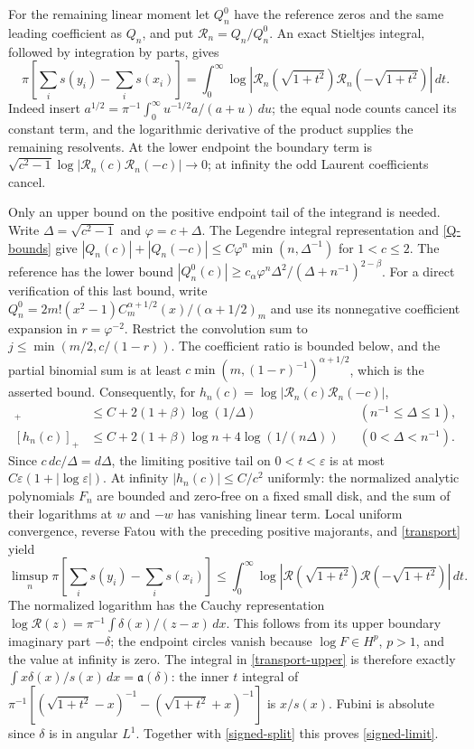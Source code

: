 \documentclass[a4paper,11pt]{amsart}
\theoremstyle{remark}\newtheorem{remark}[theorem]{Remark}
\newcommand{\dd}{\,d}
\begin{document}
For the remaining linear moment let $Q_n^0$ have the reference
zeros and the same leading coefficient as $Q_n$, and put
$\mathcal R_n=Q_n/Q_n^0$. An exact Stieltjes integral, followed by
integration by parts, gives
\begin{equation}\label{transport}
 \pi\left[\sum_i s(y_i)-\sum_i s(x_i)\right]
 =\int_0^\infty\log|\mathcal R_n(\sqrt{1+t^2})
                            \mathcal R_n(-\sqrt{1+t^2})|\dd t.
\end{equation}
Indeed insert
$a^{1/2}=\pi^{-1}\int_0^\infty u^{-1/2}a/(a+u)\dd u$;
the equal node counts cancel its constant term, and the logarithmic
derivative of the product supplies the remaining resolvents.
At the lower endpoint the boundary term is
$\sqrt{c^2-1}\log|\mathcal R_n(c)\mathcal R_n(-c)|\to0$;
at infinity the odd Laurent coefficients cancel.

Only an upper bound on the positive endpoint tail of the integrand
is needed. Write $\Delta=\sqrt{c^2-1}$ and $\varphi=c+\Delta$.
The Legendre integral representation and \eqref{Q-bounds} give
$|Q_n(c)|+|Q_n(-c)|\le C\varphi^n\min(n,\Delta^{-1})$
for $1<c\le2$. The reference has the lower bound
$|Q_n^0(c)|\ge c_\alpha\varphi^n
 \Delta^2/(\Delta+n^{-1})^{2-\beta}$.
For a direct verification of this last bound, write
$Q_n^0=2m!(x^2-1)C_m^{\alpha+1/2}(x)/(\alpha+1/2)_m$
and use its nonnegative coefficient expansion in
$r=\varphi^{-2}$. Restrict the convolution sum to
$j\le\min(m/2,c/(1-r))$. The coefficient ratio is bounded below,
and the partial binomial sum is at least
$c\min(m,(1-r)^{-1})^{\alpha+1/2}$, which is the asserted bound.
Consequently, for
$h_n(c)=\log|\mathcal R_n(c)\mathcal R_n(-c)|$,
\begin{align*}
 [h_n(c)]_+&\le C+2(1+\beta)\log(1/\Delta)
       &&(n^{-1}\le\Delta\le1),\\
 [h_n(c)]_+&\le C+2(1+\beta)\log n
                  +4\log(1/(n\Delta))&&(0<\Delta<n^{-1}).
\end{align*}
Since $c\,dc/\Delta=d\Delta$, the limiting positive tail on
$0<t<\varepsilon$ is at most
$C\varepsilon(1+|\log\varepsilon|)$.
At infinity $|h_n(c)|\le C/c^2$ uniformly: the normalized analytic
polynomials $F_n$ are bounded and zero-free on a fixed small disk,
and the sum of their logarithms at $w$ and $-w$ has vanishing linear
term. Local uniform convergence, reverse Fatou with the preceding
positive majorants, and \eqref{transport} yield
\begin{equation}\label{transport-upper}
 \limsup_n\pi\left[\sum_i s(y_i)-\sum_i s(x_i)\right]
 \le\int_0^\infty\log|\mathcal R(\sqrt{1+t^2})
                              \mathcal R(-\sqrt{1+t^2})|\dd t.
\end{equation}
The normalized logarithm has the Cauchy representation
$\log\mathcal R(z)=\pi^{-1}\int\delta(x)/(z-x)\dd x$.
This follows from its upper boundary imaginary part $-\delta$;
the endpoint circles vanish because $\log F\in H^p$, $p>1$,
and the value at infinity is zero.
The integral in \eqref{transport-upper} is therefore exactly
$\int x\delta(x)/s(x)\dd x=\mathfrak a(\delta)$:
the inner $t$ integral of
$\pi^{-1}[(\sqrt{1+t^2}-x)^{-1}-(\sqrt{1+t^2}+x)^{-1}]$
is $x/s(x)$. Fubini is absolute since $\delta$ is in angular $L^1$.
Together with \eqref{signed-split} this proves \eqref{signed-limit}.
\end{document}
